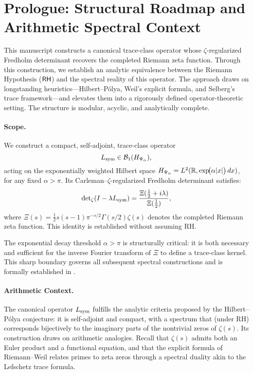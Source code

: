 \section*{Prologue: Structural Roadmap and Arithmetic Spectral Context}
\label{sec:prologue}

\medskip

\noindent
This manuscript constructs a canonical trace-class operator whose \(\zeta\)-regularized Fredholm determinant recovers the completed Riemann zeta function. Through this construction, we establish an analytic equivalence between the Riemann Hypothesis (\(\mathsf{RH}\)) and the spectral reality of this operator. The approach draws on longstanding heuristics—Hilbert–Pólya, Weil’s explicit formula, and Selberg’s trace framework—and elevates them into a rigorously defined operator-theoretic setting. The structure is modular, acyclic, and analytically complete.

\paragraph*{Scope.}
We construct a compact, self-adjoint, trace-class operator
\[
L_{\mathrm{sym}} \in \mathcal{B}_1(H_{\Psi_\alpha}),
\]
acting on the exponentially weighted Hilbert space \( H_{\Psi_\alpha} = L^2(\mathbb{R}, \exp\!\bigl(\alpha |x|\bigr)\,dx) \), for any fixed \( \alpha > \pi \). Its Carleman–\(\zeta\)-regularized Fredholm determinant satisfies:
\[
\det\nolimits_{\zeta}(I - \lambda L_{\mathrm{sym}}) = \frac{\Xi(\tfrac{1}{2} + i\lambda)}{\Xi(\tfrac{1}{2})},
\]
where \( \Xi(s) = \tfrac{1}{2}s(s-1)\pi^{-s/2} \Gamma(s/2) \zeta(s) \) denotes the completed Riemann zeta function. This identity is established without assuming RH.

The exponential decay threshold \( \alpha > \pi \) is structurally critical: it is both necessary and sufficient for the inverse Fourier transform of \( \Xi \) to define a trace-class kernel. This sharp boundary governs all subsequent spectral constructions and is formally established in .

\paragraph*{Arithmetic Context.}
The canonical operator \( L_{\mathrm{sym}} \) fulfills the analytic criteria proposed by the Hilbert–Pólya conjecture: it is self-adjoint and compact, with a spectrum that (under RH) corresponds bijectively to the imaginary parts of the nontrivial zeros of \( \zeta(s) \). Its construction draws on arithmetic analogies. Recall that \( \zeta(s) \) admits both an Euler product and a functional equation, and that the explicit formula of Riemann–Weil relates primes to zeta zeros through a spectral duality akin to the Lefschetz trace formula.

